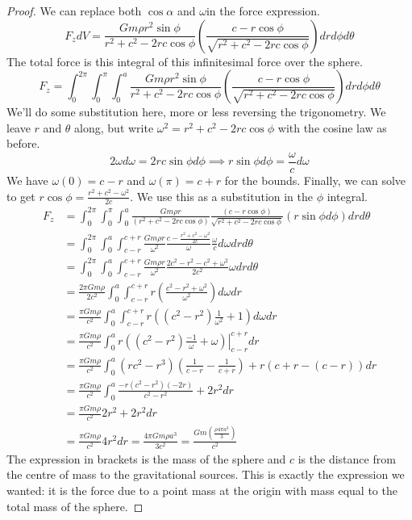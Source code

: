 \documentclass[fleqn,letterpaper]{report}
\begin{document}
\begin{proof}
We can replace both $\cos \alpha$ and $\omega $in the force
expression.
\begin{equation*}
F_z dV = \frac{Gm\rho r^2 \sin \phi}{r^2 +
c^2 - 2rc\cos \phi} \left( \frac{c - r\cos \phi}{\sqrt{r^2 +
c^2 - 2rc \cos \phi}} \right) dr d\phi d\theta
\end{equation*}
The total force is this integral of this infinitesimal force
over the sphere.
\begin{equation*}
F_z = \int_0^{2\pi} \int_0^{\pi} \int_0^a \frac{Gm\rho r^2
\sin \phi}{r^2 + c^2 - 2rc\cos \phi} \left( \frac{c - r\cos
\phi}{\sqrt{r^2 + c^2 - 2rc \cos \phi}} \right) dr d\phi
d\theta
\end{equation*}
We'll do some substitution here, more or less reversing 
the trigonometry. We leave $r$ and $\theta$ along, but
write $\omega^2 = r^2 + c^2 - 2rc\cos\phi$ with the cosine law
as before.
\begin{equation*}
2\omega d\omega = 2rc \sin \phi d\phi \implies r \sin \phi
d\phi = \frac{\omega}{c} d\omega
\end{equation*}
We have $\omega(0) = c-r$ and $\omega(\pi) = c+r$ for the
bounds. Finally, we can solve to get $r\cos \phi = \frac{r^2 +
c^2 - \omega^2}{2c}$. We use this as a substitution in the
$\phi$ integral.
\begin{align*}
F_z & = \int_0^{2\pi} \int_0^{\pi} \int_0^a 
\frac{Gm\rho r}{(r^2 + c^2 - 2rc\cos \phi)} \frac{(c-r\cos
\phi)}{\sqrt{r^2+c^2-2rc\cos\phi}} (r\sin \phi d\phi) dr
d\theta \\
& = \int_0^{2\pi} \int_0^a \int_{c-r}^{c+r} \frac{Gm\rho
r}{\omega^2} \frac{c - \frac{r^2 + c^2 -
\omega^2}{2c}}{\omega} \frac{\omega}{c} d\omega dr d\theta \\
& = \int_0^{2\pi} \int_0^a \int_{c-r}^{c+r} \frac{Gm\rho
r}{\omega^2} \frac{2c^2 - r^2 - c^2 + \omega^2}{2c^2} \omega
dr d\theta \\
&= \frac{2\pi Gm \rho}{2c^2} \int_0^a \int_{c-r}^{c+r} r \left(
\frac{c^2 -r^2 +\omega^2}{\omega^2} \right) d \omega dr \\
&= \frac{\pi Gm \rho}{c^2} \int_0^a \int_{c-r}^{c+r} r \left(
(c^2 -r^2) \frac{1}{\omega^2} + 1 \right) d \omega dr \\
&= \frac{\pi Gm \rho}{c^2} \int_0^a r \left. \left( (c^2-r^2)
\frac{-1}{\omega} + \omega \right) \right|_{c-r}^{c+r} dr \\
& = \frac{\pi Gm\rho}{c^2} \int_0^a (rc^2 - r^3) \left(
\frac{1}{c-r} - \frac{1}{c+r} \right) + r (c+r-(c-r)) dr \\
& = \frac{\pi G m \rho}{c^2} \int_0^a
\frac{-r(c^2-r^2)(-2r)}{c^2-r^2} + 2r^2 dr \\
& = \frac{\pi G m \rho}{c^2} 2r^2 + 2r^2 dr \\
& = \frac{\pi G m \rho}{c^2} 4r^2 dr = \frac{4\pi Gm \rho
a^3}{3c^2} = \frac{Gm \left( \frac{\rho 4 \pi a^3}{3}
\right)}{c^2} 
\end{align*}
The expression in brackets is the mass of the sphere and $c$
is the distance from the centre of mass to the gravitational
sources. This is exactly the expression we wanted: it is
the force due to a point mass at the origin with mass equal to
the total mass of the sphere.
\end{proof}
\end{document}
